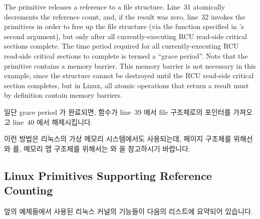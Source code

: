 The  primitive releases a reference to a file structure.
Line~31 atomically decrements the reference count, and, if the result
was zero, line~32 invokes the  primitives in order to
free up the file structure (via the  function
specified in 's second argument),
but only after all currently-executing
RCU read-side critical sections complete.
The time period required for all currently-executing RCU read-side
critical sections to complete is termed a ``grace period''.
Note that the  primitive contains
a memory barrier.
This memory barrier is not necessary in this example, since the structure
cannot be destroyed until the RCU read-side critical section completes,
but in Linux, all atomic operations that return a result must
by definition contain memory barriers.
\fi

일단 grace period 가 완료되면,  함수가 line~39 에서 file
구조체로의 포인터를 가져오고 line~40 에서 해제시킵니다.

이런 방법은 리눅스의 가상 메모리 시스템에서도 사용되는데, 페이지 구조체를
위해선  와  를, 메모리 맵
구조체를 위해서는  와  을 참고하시기 바랍니다.
\iffalse

Once the grace period completes, the \co{file_free_rcu()} function
obtains a pointer to the file structure on line~39, and frees it
on line~40.

This approach is also used by Linux's virtual-memory system,
see \co{get_page_unless_zero()} and \co{put_page_testzero()} for
page structures as well as \co{try_to_unuse()} and \co{mmput()}
for memory-map structures.
\fi

\subsection{Linux Primitives Supporting Reference Counting}
\label{sec:together:Linux Primitives Supporting Reference Counting}

앞의 예제들에서 사용된 리눅스 커널의 기능들이 다음의 리스트에 요약되어
있습니다.
\iffalse

The Linux-kernel primitives used in the above examples are
summarized in the following list.
\IfInBook{}{The RCU primitives may be unfamiliar to some readers,
	    so a brief overview with citations is included in
	    Section~\ref{sec:together:Background on RCU}.}
\fi

